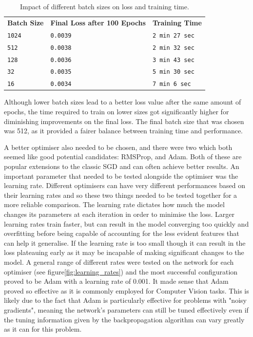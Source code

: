 \documentclass{l4proj}
\begin{document}
\begin{table}[h]
    \centering
    \caption{Impact of different batch sizes on loss and training time.}
    \label{tab:operators}
    \begin{tabular}{lll}
        \textbf{Batch Size} &   \textbf{Final Loss after 100 Epochs}      &   \textbf{Training Time}  \\    
        \texttt{1024}           &   \texttt{0.0039}                     &   \texttt{2 min 27 sec}    \\
        \texttt{512}            &   \texttt{0.0038}                     &   \texttt{2 min 32 sec}   \\ 
        \texttt{128}            &   \texttt{0.0036}                     &   \texttt{3 min 43 sec}   \\
        \texttt{32}             &   \texttt{0.0035}                     &   \texttt{5 min 30 sec}   \\
        \texttt{16}             &   \texttt{0.0034}                     &   \texttt{7 min 6 sec}    \\
    \end{tabular}
\end{table}

Although lower batch sizes lead to a better loss value after the same amount of epochs, the time required to train on lower sizes got significantly higher for diminishing improvements on the final loss. The final batch size that was chosen was 512, as it provided a fairer balance between training time and performance.

A better optimiser also needed to be chosen, and there were two which both seemed like good potential candidates: RMSProp, and Adam. Both of these are popular extensions to the classic SGD and can often achieve better results\cite{OptimizerComparison}. An important parameter that needed to be tested alongside the optimiser was the learning rate. Different optimisers can have very different performances based on their learning rates and so these two things needed to be tested together for a more reliable comparison. The learning rate dictates how much the model changes its parameters at each iteration in order to minimise the loss. Larger learning rates train faster, but can result in the model converging too quickly and overfitting before being capable of accounting for the less evident features that can help it generalise. If the learning rate is too small though it can result in the loss plateauing early as it may be incapable of making significant changes to the model. A general range of different rates were tested on the network for each optimiser (see figure\ref{fig:learning_rates}) and the most successful configuration proved to be Adam with a learning rate of 0.001. It made sense that Adam proved so effective as it is commonly employed for Computer Vision tasks\cite{Adam}. This is likely due to the fact that Adam is particularly effective for problems with "noisy gradients", meaning the network's parameters can still be tuned effectively even if the tuning information given by the backpropagation algorithm can vary greatly as it can for this problem. 
\end{document}
